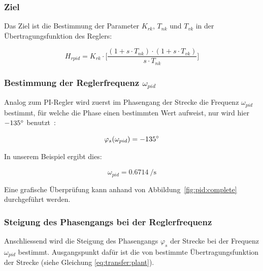 \subsubsection*{Ziel}
Das Ziel ist  die Bestimmung der Parameter $K_{rk}$, $T_{nk}$  und $T_{vk}$ in
der \"Ubertragungsfunktion des Reglers:

\begin{equation} \label{eq:pid:target}
    H_{rpid} = K_{rk} \cdot \biggl[ \frac{(1 + s \cdot T_{nk}) \cdot (1 + s \cdot T_{vk}) }{ s \cdot T_{nk} } \biggr]
\end{equation}


\subsubsection{Bestimmung der Reglerfrequenz $\omega_{pid}$}

Analog  zum PI-Regler  wird  zuerst  im Phasengang  der  Strecke die  Frequenz
$\omega_{pid}$  bestimmt,  f\"ur  welche   die  Phase  einen  bestimmten  Wert
aufweist, nur wird hier $-135\degree$ benutzt~\footnotemark[7]:

\begin{equation} \label{eq:pid:phi_s}
    \varphi_s(\omega_{pid}) = -135 \degree
\end{equation}


In unserem Beispiel ergibt dies:

\begin{equation} \label{eq:pid:omega_pid}
    \omega_{pid} = \SI{0.6714}{\per\second}
\end{equation}

Eine       grafische        \"Uberpr\"ufung       kann        anhand       von
Abbildung~\ref{fig:pid:complete} durchgef\"uhrt werden.


\subsubsection{Steigung des Phasengangs bei der Reglerfrequenz}

Anschliessend wird  die Steigung des  Phasengangs $\varphi_s$ der  Strecke bei
der  Frequenz  $\omega_{pid}$  bestimmt. Ausgangspunkt  daf\"ur  ist  die  von
 bestimmte  \"Ubertragungsfunktion der Strecke  (siehe Gleichung
\ref{eq:transfer:plant}).

